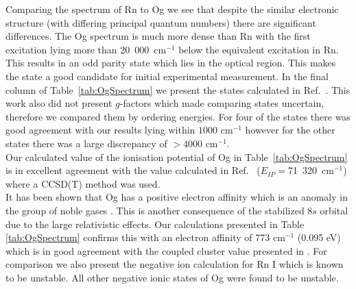 \documentclass[10pt,a4paper, twoside, openright]{report}
\begin{document}
\linebreak
Comparing the spectrum of Rn  to Og we see that despite the similar electronic structure (with differing principal quantum numbers) there are significant differences. The Og spectrum is much more dense than Rn  with the first excitation lying more than 20~000~cm$^{-1}$ below the equivalent excitation in Rn. This results in an odd parity state which lies in the optical region. This makes the  state a good candidate for initial experimental measurement. In the final column of Table~\ref{tab:OgSpectrum} we present the states calculated in Ref.~\cite{Indelicato2007}. This work also did not present $g$-factors which made comparing states uncertain, therefore we compared them by ordering energies. For four of the states there was good agreement with our results lying within $1000$ cm$^{-1}$ however for the other states there was a large discrepancy of $>4000$ cm$^{-1}$.  \\
\linebreak
Our calculated value of the ionisation potential of Og in Table~\ref{tab:OgSpectrum} is in excellent agreement with the value calculated in Ref.~\cite{Jerabek2018} ($E_{IP}=$71~320~cm$^{-1}$) where a CCSD(T) method was used. \\
\linebreak
It has been shown that Og has a positive electron affinity which is an anomaly in the group of noble gases \cite{EliavOg1996, Goidenko2003, Eliav2015}. This is another consequence of the stabilized $8s$ orbital due to the large relativistic effects. Our calculations presented in Table \ref{tab:OgSpectrum}  confirms this with an electron affinity of 773 cm$^{-1}$ (0.095 eV) which is in good agreement with the coupled cluster value presented in \cite{Goidenko2003}. For comparison we also present the negative ion calculation for Rn I which is known to be unstable. All other negative ionic states of Og were found to be unstable.
\newpage
\end{document}
